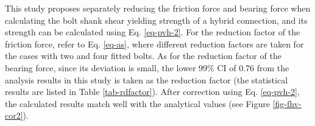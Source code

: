 This study proposes separately reducing the friction force and bearing force when calculating the bolt shank shear yielding strength of a hybrid connection, and its strength can be calculated using Eq. \ref{eq-pvh-2}. For the reduction factor of the friction force, refer to Eq. \ref{eq-as}, where different reduction factors are taken for the cases with two and four fitted bolts. As for the reduction factor of the bearing force, since its deviation is small, the lower 99\% CI of 0.76 from the analysis results in this study is taken as the reduction factor (the statistical results are listed in Table \ref{tab-rdfactor}). After correction using Eq. \ref{eq-pvh-2}, the calculated results match well with the analytical values (see Figure \ref{fig-fhv-cor2}).